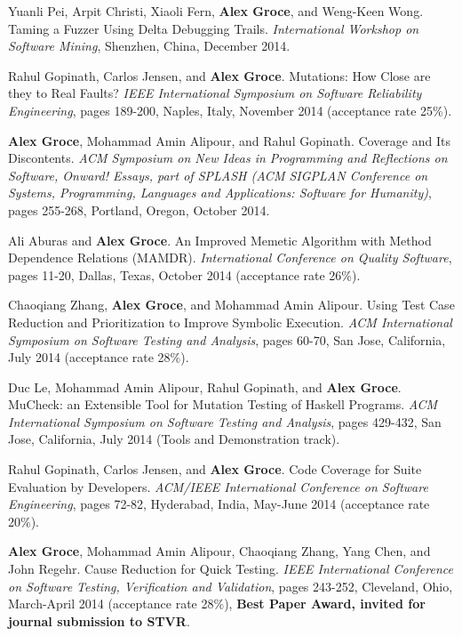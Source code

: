 \documentclass[ComputerScience]{vita}
\begin{document}
\begin{vita}
\begin{Refereed Conference and Workshop Publications}
\item Yuanli Pei, Arpit Christi, Xiaoli Fern, {\bf Alex Groce}, and Weng-Keen Wong.
\newblock Taming a Fuzzer Using Delta Debugging Trails.
\newblock \emph{International Workshop on Software Mining}, Shenzhen, China, December 2014.

\item Rahul Gopinath, Carlos Jensen, and {\bf Alex Groce}.
\newblock Mutations: How Close are they to Real Faults?
\newblock \emph{IEEE International Symposium on Software Reliability Engineering}, pages 189-200, Naples, Italy, November 2014 (acceptance rate 25\%).

\item
{\bf Alex Groce}, Mohammad Amin Alipour, and Rahul Gopinath.
\newblock Coverage and Its Discontents.
\newblock \emph{ACM Symposium on New Ideas in Programming and Reflections on Software, Onward! Essays, part of SPLASH (ACM SIGPLAN Conference on Systems, Programming, Languages and Applications: Software for Humanity)}, pages 255-268, Portland, Oregon, October 2014.

\item
Ali Aburas and {\bf Alex Groce}.
\newblock An Improved Memetic Algorithm with Method Dependence Relations (MAMDR).
\newblock \emph{International Conference on Quality Software}, pages 11-20, Dallas, Texas, October 2014 (acceptance rate 26\%).

\item
Chaoqiang Zhang, {\bf Alex Groce}, and Mohammad Amin Alipour.
\newblock Using Test Case Reduction and Prioritization to Improve Symbolic Execution.
\newblock \emph{ACM International Symposium on Software Testing and Analysis}, pages 60-70, San Jose, California, July 2014 (acceptance rate 28\%).

\item
Duc Le, Mohammad Amin Alipour, Rahul Gopinath, and {\bf Alex Groce}.
\newblock MuCheck: an Extensible Tool for Mutation Testing of Haskell Programs.
\newblock \emph{ACM International Symposium on Software Testing and Analysis}, pages 429-432, San Jose, California, July 2014 (Tools and Demonstration track). 

\item
Rahul Gopinath, Carlos Jensen, and {\bf Alex Groce}.
\newblock Code Coverage for Suite Evaluation by Developers.
\newblock \emph{ACM/IEEE International Conference on Software Engineering}, pages 72-82, Hyderabad, India, May-June 2014 (acceptance rate 20\%). 

\item
{\bf Alex Groce}, Mohammad Amin Alipour, Chaoqiang Zhang, Yang Chen, and John Regehr.
\newblock Cause Reduction for Quick Testing.
\newblock \emph {IEEE International Conference on Software Testing, Verification and Validation}, pages 243-252, Cleveland, Ohio, March-April 2014 (acceptance rate 28\%), {\bf Best Paper Award, invited for journal submission to STVR}.


\end{Refereed Conference and Workshop Publications}
\end{vita}
\end{document}

